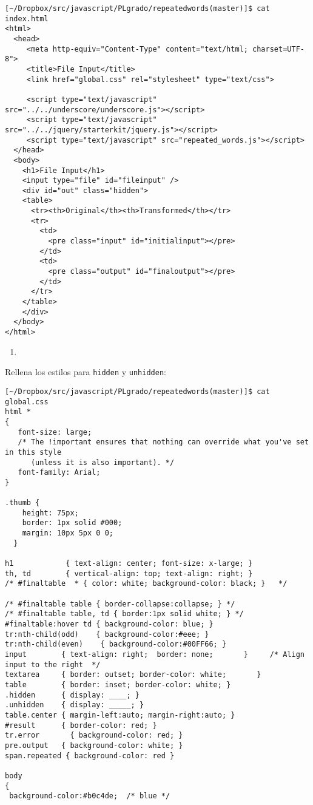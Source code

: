 \begin{verbatim}
[~/Dropbox/src/javascript/PLgrado/repeatedwords(master)]$ cat index.html 
<html>
  <head>
     <meta http-equiv="Content-Type" content="text/html; charset=UTF-8">
     <title>File Input</title>
     <link href="global.css" rel="stylesheet" type="text/css">

     <script type="text/javascript" src="../../underscore/underscore.js"></script>
     <script type="text/javascript" src="../../jquery/starterkit/jquery.js"></script>
     <script type="text/javascript" src="repeated_words.js"></script>
  </head>
  <body>
    <h1>File Input</h1>
    <input type="file" id="fileinput" />
    <div id="out" class="hidden">
    <table>
      <tr><th>Original</th><th>Transformed</th></tr>
      <tr>
        <td>
          <pre class="input" id="initialinput"></pre>
        </td>
        <td>
          <pre class="output" id="finaloutput"></pre>
        </td>
      </tr>
    </table>
    </div>
  </body>
</html>
\end{verbatim}

\begin{enumerate}
\item 
{}
\end{enumerate}

Rellena los estilos para \verb|hidden| y \verb|unhidden|:
\begin{verbatim}
[~/Dropbox/src/javascript/PLgrado/repeatedwords(master)]$ cat global.css 
html *
{
   font-size: large; 
   /* The !important ensures that nothing can override what you've set in this style 
      (unless it is also important). */
   font-family: Arial;
}

.thumb {
    height: 75px;
    border: 1px solid #000;
    margin: 10px 5px 0 0;
  }

h1            { text-align: center; font-size: x-large; }
th, td        { vertical-align: top; text-align: right; }   
/* #finaltable  * { color: white; background-color: black; }   */

/* #finaltable table { border-collapse:collapse; } */
/* #finaltable table, td { border:1px solid white; } */
#finaltable:hover td { background-color: blue; } 
tr:nth-child(odd)    { background-color:#eee; }
tr:nth-child(even)    { background-color:#00FF66; }
input        { text-align: right;  border: none;       }     /* Align input to the right  */
textarea     { border: outset; border-color: white;       }                        
table        { border: inset; border-color: white; }
.hidden      { display: ____; }
.unhidden    { display: _____; }
table.center { margin-left:auto; margin-right:auto; }
#result      { border-color: red; }
tr.error       { background-color: red; }
pre.output   { background-color: white; }
span.repeated { background-color: red }

body
{
 background-color:#b0c4de;  /* blue */
\end{verbatim}

